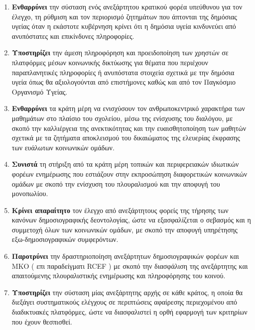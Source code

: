 \documentclass[12pt, letterpaper]{article}
\begin{document}
\begin{enumerate}
  \item \textbf{Ενθαρρύνει} την σύσταση ενός ανεξάρτητου κρατικού φορέα υπεύθυνου για τον έλεγχο, τη ρύθμιση και τον περιορισμό ζητημάτων που άπτονται της δημόσιας υγείας όταν η εκάστοτε κυβέρνηση κρίνει ότι η δημόσια υγεία κινδυνεύει από ανυπόστατες και επικίνδυνες πληροφορίες.
  
  \item \textbf{Υποστηρίζει} την άμεση πληροφόρηση και προειδοποίηση των χρηστών σε πλατφόρμες μέσων κοινωνικής δικτύωσης για θέματα που περιέχουν παραπλανητικές πληροφορίες ή ανυπόστατα στοιχεία σχετικά με την δημόσια υγεία όπως θα αξιολογούνται από επιστήμονες καθώς και από τον Παγκόσμιο Οργανισμό Υγείας.
  
  \item \textbf{Ενθαρρύνει} τα κράτη μέρη να ενισχύσουν τον ανθρωποκεντρικό χαρακτήρα των μαθημάτων στο πλαίσιο του σχολείου, μέσω της ενίσχυσης του διαλόγου, με σκοπό την καλλιέργεια της ανεκτικότητας και την ευαισθητοποίηση των μαθητών σχετικά με τα ζητήματα αποκλεισμού του δικαιώματος της ελευερίας έκφρασης των ευάλωτων κοινωνικών ομάδων.
  
  \item \textbf{Συνιστά} τη στήριξη από τα κράτη μέρη τοπικών και περιφερειακών ιδιωτικών φορέων ενημέρωσης που εστιάζουν στην εκπροσώπηση διαφορετικών κοινωνικών ομάδων με σκοπό την ενίσχυση του πλουραλισμού και την αποφυγή του μονοπωλίου.
  
  \item \textbf{Κρίνει απαραίτητο} τον έλεγχο από ανεξάρτητους φορείς της τήρησης των κανόνων δημοσιογραφικής δεοντολογίας, ώστε να εξασφαλίζεται ο σεβασμός και η συμμετοχή όλων των κοινωνικών ομάδων, με σκοπό την αποφυγή υπηρέτησης εξω-δημοσιογραφικών συμφερόντων.
  
  \item \textbf{Παροτρύνει} την δραστηριοποίηση ανεξάρτητων δημοσιογραφικών φορέων και ΜΚΟ ( επι παραδείγματι \textlatin{RCEF} ) με σκοπό την διασφάλιση της ανεξάρτητης και απαιτούμενης πλουραλιστικής ενημέρωσης και πληροφόρησης του κοινού.
  
  \item \textbf{Υποστηρίζει} την σύσταση μίας ανεξάρτητης αρχής σε κάθε κράτος, η οποία θα διεξάγει συστηματικούς ελέγχους σε περιπτώσεις αφαίρεσης περιεχομένου από διαδικτυακές πλατφόρμες, ώστε να διασφαλιστεί η ορθή εφαρμογή των κριτηρίων που έχουν θεσπισθεί.
  
\end{enumerate}
\end{document}
